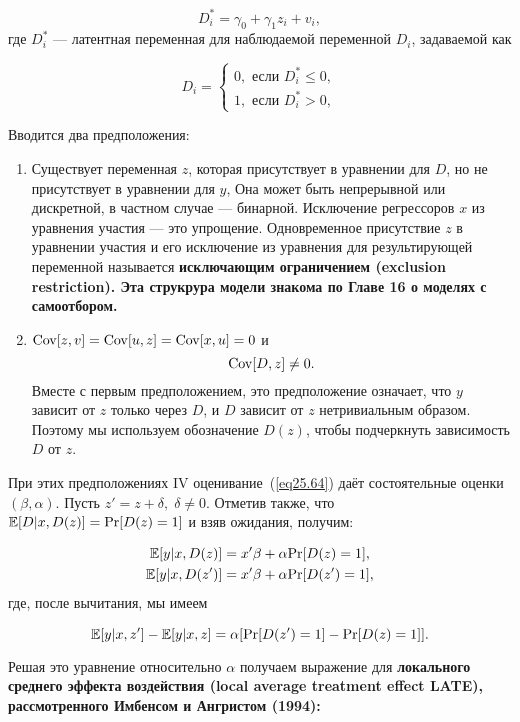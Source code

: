 \begin{equation}
\label{eq25.65}
D_i^* = \gamma_0 + \gamma_1 z_i + v_i,
\end{equation}
где $D_i^*$  --- латентная переменная для наблюдаемой переменной $D_i$, задаваемой как

\begin{equation}
\label{eq25.66}
D_i=\begin{cases}
0, \text{ если }D_i^* \le 0, \\
1, \text{ если }D_i^*>0,
\end{cases}
\end{equation}

Вводится два предположения:

\begin{enumerate}
\item Существует переменная $z$, которая присутствует в уравнении для $D$, но не присутствует в уравнении для $y$, Она может быть непрерывной или дискретной, в частном случае ---  бинарной. Исключение регрессоров $x$ из уравнения участия --- это упрощение. Одновременное присутствие $z$ в уравнении участия и его исключение из уравнения для результирующей переменной называется \bfseries исключающим ограничением (exclusion restriction). \mdseries Эта струкрура модели знакома по Главе 16 о моделях с самоотбором. 
\item $\mathrm{Cov} [z,v] = \mathrm{Cov} [u,z] = \mathrm{Cov} [x,u] = 0$ и 
$$
\mathrm{Cov} [D, z] \ne 0.
$$
Вместе с первым предположением, это предположение означает, что $y$ зависит от $z$ только через $D$, и $D$ зависит от $z$ нетривиальным образом. Поэтому мы используем обозначение $D(z)$, чтобы подчеркнуть зависимость $D$ от $z$.
\end{enumerate}

При этих предположениях IV оценивание~(\ref{eq25.64}) даёт состоятельные оценки $(\beta, \alpha)$. Пусть $z' = z + \delta, \; \delta \ne 0$. Отметив также, что $\mathbb{E} [D | x, D(z)] = \mathrm{Pr} [D(z) = 1]$ и взяв ожидания, получим:

\begin{align}
\mathbb{E} [y | x, D(z) ] & = x' \beta + \alpha \mathrm{Pr}[D(z) = 1],  \nonumber \\
\mathbb{E} [y | x, D(z') ] & = x' \beta + \alpha \mathrm{Pr}[D(z') = 1], \nonumber 
\end{align}
где, после вычитания, мы имеем

$$
\mathbb{E} [y | x, z' ] - \mathbb{E} [y | x, z ] = \alpha [ \mathrm{Pr}[D(z') = 1] -  \mathrm{Pr}[D(z) = 1] ].
$$

Решая это уравнение относительно $\alpha$ получаем выражение для \bfseries локального среднего эффекта воздействия (local average treatment effect LATE), \mdseries рассмотренного Имбенсом и Ангристом (1994):

